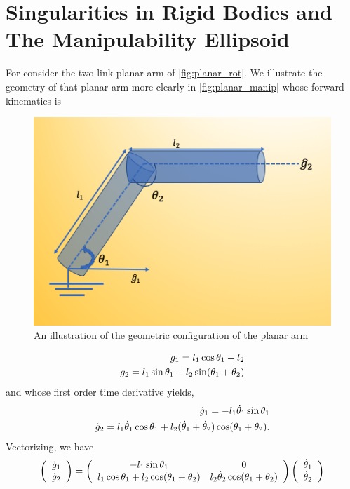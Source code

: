 \section{Singularities in Rigid Bodies and The Manipulability Ellipsoid}
%
For consider the two link planar arm of \autoref{fig:planar_rot}.  We illustrate the geometry of that planar arm more clearly in \autoref{fig:planar_manip} whose forward kinematics is
%
\begin{figure}[tb!]
	\centering
	\includegraphics[width=.7\columnwidth]{figures/planar_manip.png}
	\caption{An illustration of the geometric configuration of the planar arm}
	\label{fig:planar_manip}
\end{figure}
%
\begin{subequations}
	\begin{align}
	g_1 = l_1 \cos \theta_1 + l_2 \nonumber \\
	g_2 = l_1 \sin \theta_1 + l_2 \sin(\theta_1+\theta_2)
	\end{align}
\end{subequations}
% 
and whose first order time derivative yields,
%
\begin{subequations}
	\begin{align}
	\dot{g}_1 = -l_1 \dot{\theta}_1 \sin \theta_1  \nonumber \\
	\dot{g}_2 = l_1 \dot{\theta}_1 \cos \theta_1 + l_2 (\dot{\theta}_1+\dot{\theta}_2) \cos(\theta_1+\theta_2).
	\end{align}
\end{subequations}
%
Vectorizing, we have
%
\begin{align}
	\left(\begin{array}{c}
		\dot{g}_1 \\
		\dot{g}_2
	\end{array}\right) = \left(\begin{array}{cc}
	-l_1  \sin \theta_1 & 0 \\
	 l_1  \cos \theta_1 + l_2  \cos(\theta_1+\theta_2) &  l_2 \dot{\theta}_2 \cos(\theta_1+\theta_2)
	\end{array}\right)
	\left(\begin{array}{c}
	\dot{\theta}_1 \\
	\dot{\theta}_2
	\end{array}\right)
\end{align}
